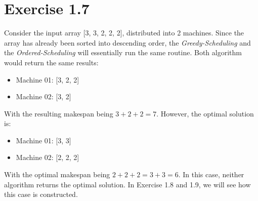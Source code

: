 \documentclass[11pt]{article}
\begin{document}
\section*{Exercise 1.7}
Consider the input array [3, 3, 2, 2, 2], distributed into 2 machines. 
Since the array has already been sorted into descending order, the \textit{Greedy-Scheduling} and the \textit{Ordered-Scheduling} will 
essentially run the same routine. 
\newline
Both algorithm would return the same results:
\begin{itemize}
  \item Machine 01: [3, 2, 2]
  \item Machine 02: [3, 2]
\end{itemize}
With the resulting makespan being $3 + 2 + 2 = 7$.
\newline
However, the optimal solution is:
\begin{itemize}
  \item Machine 01: [3, 3]
  \item Machine 02: [2, 2, 2]
\end{itemize}
With the optimal makespan being $2 + 2 + 2 = 3 + 3 = 6$.
\newline
In this case, neither algorithm returns the optimal solution. In Exercise 1.8 and 1.9, we will see how this case is constructed.
\end{document}
